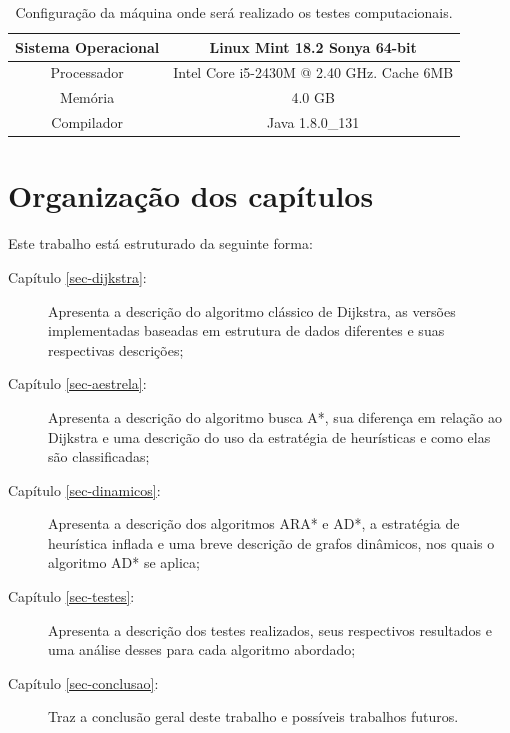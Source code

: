 \begin{table}[H]
\centering
\caption{Configuração da máquina onde será realizado os testes computacionais.}
\label{tbl-intro-configuracaomaquina}
\begin{adjustbox}{max width=\textwidth}
\begin{tabular}{|c|c|}
\hline
Sistema Operacional & Linux Mint  18.2  Sonya 64-bit            \\ \hline
Processador         & Intel Core i5-2430M @ 2.40 GHz. Cache 6MB \\ \hline
Memória             & 4.0 GB                                    \\ \hline
Compilador          & Java 1.8.0\_131                           \\ \hline
\end{tabular}
\end{adjustbox}
\end{table}

\section{Organização dos capítulos}
\label{sec-intro-organizaocao}
Este trabalho está estruturado da seguinte forma:
\begin{description}
\item[Capítulo \ref{sec-dijkstra}:] Apresenta a descrição do algoritmo clássico de Dijkstra, as versões implementadas baseadas em estrutura de dados diferentes e suas respectivas descrições;
\item[Capítulo \ref{sec-aestrela}:] Apresenta a descrição do algoritmo busca A*, sua diferença em relação ao Dijkstra e uma descrição do uso da estratégia de heurísticas e como elas são classificadas;
\item[Capítulo \ref{sec-dinamicos}:] Apresenta a descrição dos algoritmos ARA* e AD*, a estratégia de heurística inflada e uma breve descrição de grafos dinâmicos, nos quais o algoritmo AD* se aplica;
\item[Capítulo \ref{sec-testes}:] Apresenta a descrição dos testes realizados, seus respectivos resultados e uma análise desses para cada algoritmo abordado;
\item[Capítulo \ref{sec-conclusao}:] Traz a conclusão geral deste trabalho e possíveis trabalhos futuros.
\end{description}